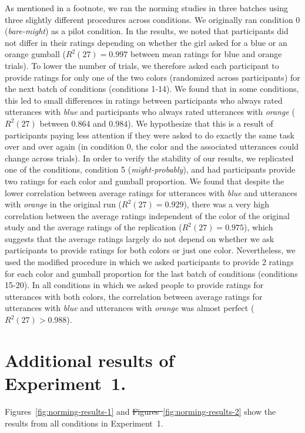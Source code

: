 \documentclass[man, floatsintext]{apa6}
\providecommand{\DIFdel}[1]{{\protect\color{red}\sout{#1}}}                      %
\providecommand{\DIFdelbegin}{} %
\providecommand{\DIFdelend}{} %
\newcommand{\DIFscaledelfig}{0.5}
\newlength{\DIFdelgraphicswidth} %
\newlength{\DIFdelgraphicsheight} %
\newcommand{\DIFdelincludegraphics}[2][]{%
\sbox{\DIFdelgraphicsbox}{\DIFOincludegraphics[#1]{#2}}%
\settoboxwidth{\DIFdelgraphicswidth}{\DIFdelgraphicsbox} %
\settoboxtotalheight{\DIFdelgraphicsheight}{\DIFdelgraphicsbox} %
\scalebox{\DIFscaledelfig}{%
\parbox[b]{\DIFdelgraphicswidth}{\usebox{\DIFdelgraphicsbox}\\[-\baselineskip] \rule{\DIFdelgraphicswidth}{0em}}\llap{\resizebox{\DIFdelgraphicswidth}{\DIFdelgraphicsheight}{%
\setlength{\unitlength}{\DIFdelgraphicswidth}%
\begin{picture}(1,1)%
\thicklines\linethickness{2pt} %
{\color[rgb]{1,0,0}\put(0,0){\framebox(1,1){}}}%
{\color[rgb]{1,0,0}\put(0,0){\line( 1,1){1}}}%
{\color[rgb]{1,0,0}\put(0,1){\line(1,-1){1}}}%
\end{picture}%
}\hspace*{3pt}}} %
} %
\DeclareRobustCommand{\DIFdelbegin}{\DIFOdelbegin \let\includegraphics\DIFdelincludegraphics} %
\DeclareRobustCommand{\DIFdelend}{\DIFOaddend \let\includegraphics\DIFOincludegraphics} %
\begin{document}
As mentioned in a footnote, we ran the norming studies in three batches using three slightly different procedures across conditions. We originally ran condition 0 (\emph{bare-might}) as a pilot condition. In the results, we noted that participants did not differ in their ratings depending on whether the girl asked for a blue or an orange gumball ($R^2(27)=0.997$ between mean ratings for blue and orange trials). To lower the number of trials, we therefore asked each participant to provide ratings for only one of the two colors (randomized across participants) for the next batch of conditions (conditions 1-14). We found that in some conditions, this led to small differences in ratings between participants who always rated utterances with \emph{blue} and participants who always rated utterances with \textit{orange} ($R^2(27)$ between $0.864$ and $0.984$). We hypothesize that this is a result of participants paying less attention if they were asked to do exactly the same task over and over again (in condition 0, the color and the associated utterances could change across trials). In order to verify the stability of our results, we replicated one of the conditions, condition 5 (\emph{might-probably}), and had participants provide two ratings for each color and gumball proportion. We found that despite the lower correlation between average ratings for utterances with \emph{blue} and utterances with \emph{orange} in the original run ($R^2(27)=0.929$), there was a very high correlation between the average ratings independent of the color of the original study and the average ratings of the replication ($R^2(27)=0.975$), which suggests that the average ratings largely do not depend on whether we ask participants to provide ratings for both colors or just one color. Nevertheless, we used the modified procedure in which we asked participants to provide 2 ratings for each color and gumball proportion for the last batch of conditions (conditions 15-20). In all conditions in which we asked people to provide ratings for utterances with both colors, the correlation between average ratings for utterances with \emph{blue} and utterances with \emph{orange} was almost perfect ($R^2(27)>0.988$).


\section{Additional results of Experiment~1.}
\setcounter{section}{2}

Figures~\ref{fig:norming-results-1} and \DIFdelbegin \DIFdel{Figures~}\DIFdelend \ref{fig:norming-results-2} show the results from all conditions in Experiment~1. 
\end{document}
